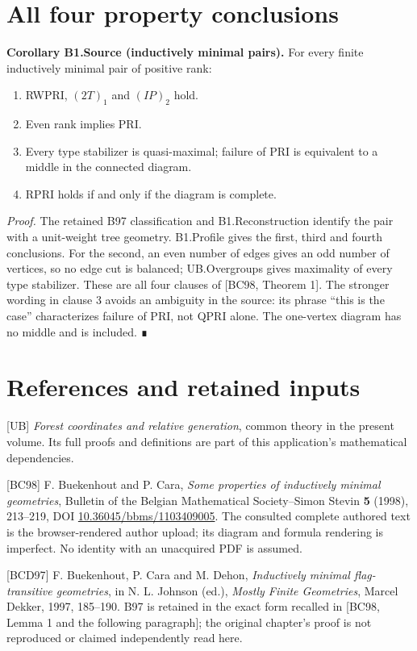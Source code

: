 \section{All four property conclusions}
\textbf{Corollary B1.Source (inductively minimal pairs).} For every finite inductively minimal pair of positive rank:

\begin{enumerate}
\def\labelenumi{\arabic{enumi}.}
\tightlist
\item
  RWPRI, \((2T)_1\) and \((IP)_2\) hold.
\item
  Even rank implies PRI.
\item
  Every type stabilizer is quasi-maximal; failure of PRI is equivalent to a middle in the connected diagram.
\item
  RPRI holds if and only if the diagram is complete.
\end{enumerate}

\emph{Proof.} The retained B97 classification and B1.Reconstruction identify the pair with a unit-weight tree geometry. B1.Profile gives the first, third and fourth conclusions. For the second, an even number of edges gives an odd number of vertices, so no edge cut is balanced; UB.Overgroups gives maximality of every type stabilizer. These are all four clauses of {[}BC98, Theorem 1{]}. The stronger wording in clause 3 avoids an ambiguity in the source: its phrase ``this is the case'' characterizes failure of PRI, not QPRI alone. The one-vertex diagram has no middle and is included. ∎

\section*{References and retained inputs}
{[}UB{]} \emph{Forest coordinates and relative generation}, common theory in the present volume. Its full proofs and definitions are part of this application's mathematical dependencies.

{[}BC98{]} F. Buekenhout and P. Cara, \emph{Some properties of inductively minimal geometries}, Bulletin of the Belgian Mathematical Society--Simon Stevin \textbf{5} (1998), 213--219, DOI \url{10.36045/bbms/1103409005}. The consulted complete authored text is the browser-rendered author upload; its diagram and formula rendering is imperfect. No identity with an unacquired PDF is assumed.

{[}BCD97{]} F. Buekenhout, P. Cara and M. Dehon, \emph{Inductively minimal flag-transitive geometries}, in N. L. Johnson (ed.), \emph{Mostly Finite Geometries}, Marcel Dekker, 1997, 185--190. B97 is retained in the exact form recalled in {[}BC98, Lemma 1 and the following paragraph{]}; the original chapter's proof is not reproduced or claimed independently read here.


